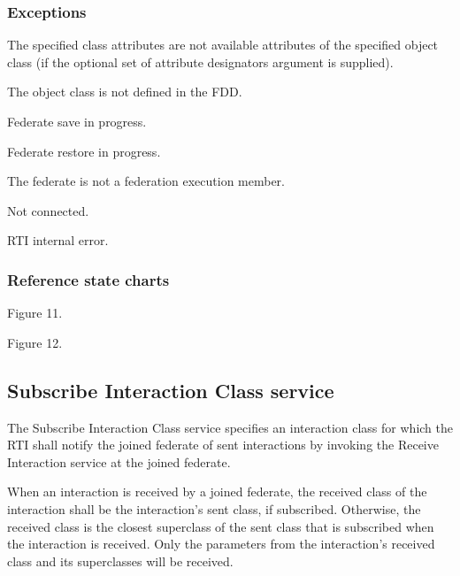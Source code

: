 \begin{compactstdpage}
    \subsubsection{Exceptions}
    \begin{stdalphalist}
        \item The specified class attributes are not available attributes of the specified object class (if the optional set of attribute designators argument is supplied).
        \item The object class is not defined in the FDD.
        \item Federate save in progress.
        \item Federate restore in progress.
        \item The federate is not a federation execution member.
        \item Not connected.
        \item RTI internal error.
    \end{stdalphalist}

    \subsubsection{Reference state charts}
    \begin{stdalphalist}
        \item Figure 11.\item Figure 12.
    \end{stdalphalist}

    \subsection{Subscribe Interaction Class service}

    The Subscribe Interaction Class service specifies an interaction class for which the RTI shall notify the joined federate of sent interactions by invoking the Receive Interaction \rtiinitiated{} service at the joined federate.

    When an interaction is received by a joined federate, the received class of the interaction shall be the interaction's sent class, if subscribed. Otherwise, the received class is the closest superclass of the sent class that is subscribed when the interaction is received. Only the parameters from the interaction's received class and its superclasses will be received.
\end{compactstdpage}

\clearpage

